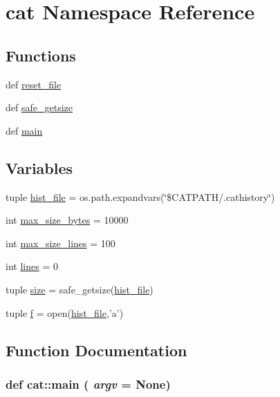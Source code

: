 \hypertarget{namespacecat}{
\section{cat Namespace Reference}
\label{namespacecat}
}
\subsection*{Functions}
\begin{DoxyCompactItemize}
\item 
def \hyperlink{namespacecat_a3278eaa551763fdc75174bf1765a1518}{reset\_\-file}
\item 
def \hyperlink{namespacecat_ac6a71fb01aa157ac108135cd05a52f50}{safe\_\-getsize}
\item 
def \hyperlink{namespacecat_a14cb7ae4fbe638a32d68dfd78c876d01}{main}
\end{DoxyCompactItemize}
\subsection*{Variables}
\begin{DoxyCompactItemize}
\item 
tuple \hyperlink{namespacecat_a1831d88841943766deffd7e36aea5d5e}{hist\_\-file} = os.path.expandvars(\char`\"{}\$CATPATH/.cathistory\char`\"{})
\item 
int \hyperlink{namespacecat_a4834511904f5301f0e7e630b905f41f4}{max\_\-size\_\-bytes} = 10000
\item 
int \hyperlink{namespacecat_ae978903cc863912f5726d4cc88f7468d}{max\_\-size\_\-lines} = 100
\item 
int \hyperlink{namespacecat_a9ac0227214d191647fb3a27229333ec3}{lines} = 0
\item 
tuple \hyperlink{namespacecat_a9299435c5156f5bdf06840adae40901c}{size} = safe\_\-getsize(\hyperlink{namespacecat_a1831d88841943766deffd7e36aea5d5e}{hist\_\-file})
\item 
tuple \hyperlink{namespacecat_a745fdeb4b562b7efdbfd1d05ee5db903}{f} = open(\hyperlink{namespacecat_a1831d88841943766deffd7e36aea5d5e}{hist\_\-file},'a')
\end{DoxyCompactItemize}


\subsection{Function Documentation}
\hypertarget{namespacecat_a14cb7ae4fbe638a32d68dfd78c876d01}{
\subsubsection[{main}]{\setlength{\rightskip}{0pt plus 5cm}def cat::main ( {\em argv} = {\ttfamily None})}}
\label{namespacecat_a14cb7ae4fbe638a32d68dfd78c876d01}



